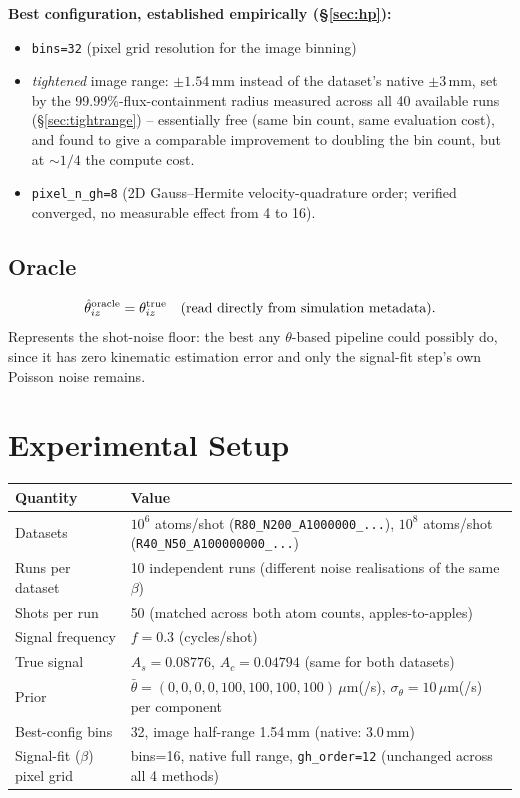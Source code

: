 \documentclass[11pt,a4paper]{article}
\newcommand{\code}[1]{\texttt{#1}}
\begin{document}
\textbf{Best configuration, established empirically (\S\ref{sec:hp}):}
\begin{itemize}
  \item \code{bins=32} (pixel grid resolution for the image binning)
  \item \emph{tightened} image range: $\pm 1.54\,$mm instead of the
    dataset's native $\pm 3\,$mm, set by the 99.99\%-flux-containment
    radius measured across all 40 available runs (\S\ref{sec:tightrange}) --
    essentially free (same bin count, same evaluation cost), and found to
    give a comparable improvement to doubling the bin count, but at
    $\sim\!1/4$ the compute cost.
  \item \code{pixel\_n\_gh=8} (2D Gauss--Hermite velocity-quadrature order;
    verified converged, no measurable effect from 4 to 16).
\end{itemize}

\subsection{Oracle}
\[
  \hat\theta_{iz}^{\rm oracle} = \theta_{iz}^{\rm true} \quad\text{(read directly from simulation metadata)}.
\]
Represents the shot-noise floor: the best any $\theta$-based pipeline could
possibly do, since it has zero kinematic estimation error and only the
signal-fit step's own Poisson noise remains.

\section{Experimental Setup}
\label{sec:setup}

\begin{center}
\begin{tabular}{@{}lp{10cm}@{}}
\toprule
Quantity & Value \\
\midrule
Datasets & $10^6$ atoms/shot (\code{R80\_N200\_A1000000\_...}), $10^8$ atoms/shot (\code{R40\_N50\_A100000000\_...}) \\
Runs per dataset & 10 independent runs (different noise realisations of the same $\beta$) \\
Shots per run & 50 (matched across both atom counts, apples-to-apples) \\
Signal frequency & $f=0.3$ (cycles/shot) \\
True signal & $A_s=0.08776$, $A_c=0.04794$ (same for both datasets) \\
Prior & $\bar\theta=(0,0,0,0,100,100,100,100)\,\mu$m(/s), $\sigma_\theta=10\,\mu$m(/s) per component \\
Best-config bins & 32, image half-range 1.54\,mm (native: 3.0\,mm) \\
Signal-fit ($\beta$) pixel grid & bins=16, native full range, \code{gh\_order=12} (unchanged across all 4 methods) \\
\bottomrule
\end{tabular}
\end{center}
\end{document}
